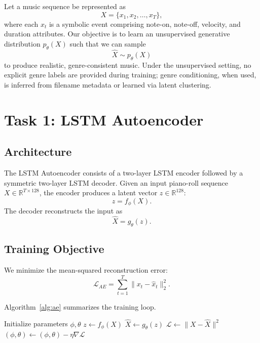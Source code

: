 \documentclass[conference]{IEEEtran}
\begin{document}
Let a music sequence be represented as
\begin{equation}
X = \{x_1, x_2, \ldots, x_T\},
\end{equation}
where each $x_t$ is a symbolic event comprising note-on, note-off,
velocity, and duration attributes. Our objective is to learn an
unsupervised generative distribution $p_\theta(X)$ such that we can sample
\begin{equation}
\hat{X} \sim p_\theta(X)
\end{equation}
to produce realistic, genre-consistent music. Under the unsupervised
setting, no explicit genre labels are provided during training; genre
conditioning, when used, is inferred from filename metadata or learned via
latent clustering.

\section{Task 1: LSTM Autoencoder} \label{sec:task1}

\subsection{Architecture}
The LSTM Autoencoder consists of a two-layer LSTM encoder followed by a
symmetric two-layer LSTM decoder. Given an input piano-roll sequence
$X \in \mathbb{R}^{T \times 128}$, the encoder produces a latent vector
$z \in \mathbb{R}^{128}$:
\begin{equation}
z = f_\phi(X).
\end{equation}
The decoder reconstructs the input as
\begin{equation}
\hat{X} = g_\theta(z).
\end{equation}

\subsection{Training Objective}
We minimize the mean-squared reconstruction error:
\begin{equation}
\mathcal{L}_{AE} = \sum_{t=1}^{T} \lVert x_t - \hat{x}_t \rVert_2^2.
\end{equation}

Algorithm~\ref{alg:ae} summarizes the training loop.

\begin{algorithm}
\caption{LSTM Autoencoder Training}
\label{alg:ae}
\begin{algorithmic}[1]
\STATE Initialize parameters $\phi, \theta$
        \STATE $z \leftarrow f_\phi(X)$
        \STATE $\hat{X} \leftarrow g_\theta(z)$
        \STATE $\mathcal{L} \leftarrow \lVert X - \hat{X} \rVert^2$
        \STATE $(\phi, \theta) \leftarrow (\phi, \theta) - \eta \nabla \mathcal{L}$
    \ENDFOR
\ENDFOR
\end{algorithmic}
\end{algorithm}
\end{document}
